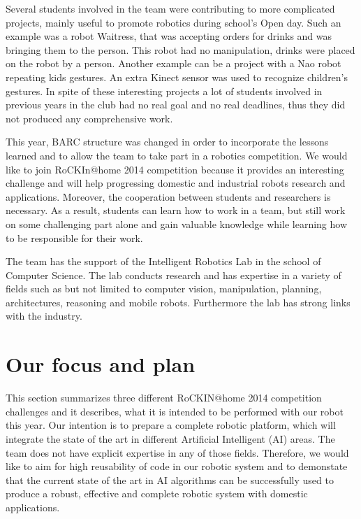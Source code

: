 \documentclass[conference]{IEEEtran}
\begin{document}
Several students involved in the team were contributing to more complicated projects, mainly useful to promote robotics during school's Open day. Such an example was a robot Waitress, that was accepting orders for drinks and was bringing them to the person. This robot had no manipulation, drinks were placed on the robot by a person. Another example can be a project with a Nao robot repeating kids gestures. An extra Kinect sensor was used to recognize children's gestures. In spite of these interesting projects a lot of students involved in previous years in the club had no real goal and no real deadlines, thus they did not produced any comprehensive work.

This year, BARC structure was changed in order to incorporate the lessons learned and to allow the team to take part in a robotics competition. We would like to join RoCKIn@home 2014 competition because it provides an interesting challenge and will help progressing domestic and industrial robots research and applications. Moreover, the cooperation between students and researchers is necessary. As a result, students can learn how to work in a team, but still work on some challenging part alone and gain valuable knowledge while learning how to be responsible for their work.

The team has the support of the Intelligent Robotics Lab \cite{irlab} in the school of Computer Science. The lab conducts research and has expertise in a variety of fields such as but not limited to computer vision, manipulation, planning, architectures, reasoning and mobile robots. Furthermore the lab has strong links with the industry. 

 
\section{Our focus and plan}

This section summarizes three different RoCKIN@home 2014 competition challenges and it describes, what it is intended to be performed with our robot this year. Our intention is to prepare a complete robotic platform, which will integrate the state of the art in different Artificial Intelligent (AI) areas. The team does not have explicit expertise in any of those fields. Therefore, we would like to aim for high reusability of code in our robotic system and to demonstate that the current state of the art in AI algorithms can be successfully used to produce a robust, effective and complete robotic system with domestic applications.  
\end{document}
